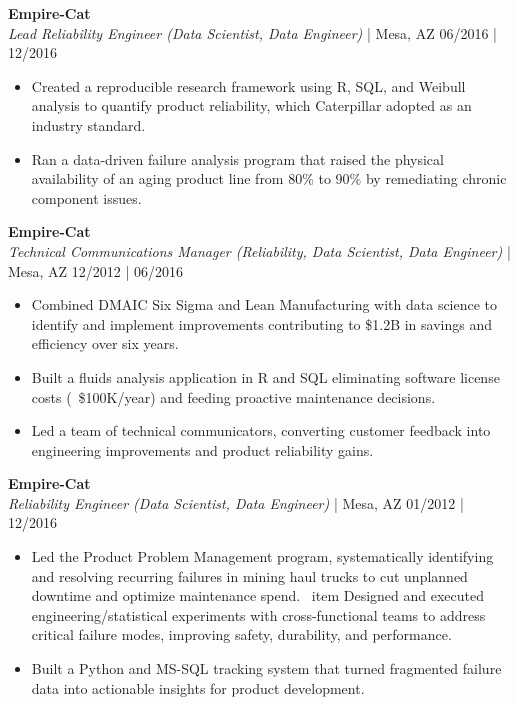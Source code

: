 \documentclass[10pt, letterpaper, sans]{article}
\begin{document}
\textbf{Empire-Cat} \\
\textit{Lead Reliability Engineer (Data Scientist, Data Engineer)} | Mesa, AZ \hfill 06/2016 | 12/2016

\begin{itemize}
    
    \item Created a reproducible research framework using R, SQL, and Weibull analysis to quantify product reliability, which Caterpillar adopted as an industry standard.
    
    \item Ran a data-driven failure analysis program that raised the physical availability of an aging product line from 80\% to 90\% by remediating chronic component issues.
  
\end{itemize}


\textbf{Empire-Cat} \\
\textit{Technical Communications Manager (Reliability, Data Scientist, Data Engineer)} | Mesa, AZ \hfill 12/2012 | 06/2016

\begin{itemize}
    
    \item Combined DMAIC Six Sigma and Lean Manufacturing with data science to identify and implement improvements contributing to \$1.2B in savings and efficiency over six years.
    
    \item Built a fluids analysis application in R and SQL eliminating software license costs (~\$100K/year) and feeding proactive maintenance decisions.
    
    \item Led a team of technical communicators, converting customer feedback into engineering improvements and product reliability gains.
  
\end{itemize}


\textbf{Empire-Cat} \\
\textit{Reliability Engineer (Data Scientist, Data Engineer)} | Mesa, AZ \hfill 01/2012 | 12/2016

\begin{itemize} 
    
    \item Led the Product Problem Management program, systematically identifying and resolving recurring failures in mining haul trucks to cut unplanned downtime and optimize maintenance spend.
    \
    item Designed and executed engineering/statistical experiments with cross-functional teams to address critical failure modes, improving safety, durability, and performance.
    
    \item Built a Python and MS-SQL tracking system that turned fragmented failure data into actionable insights for product development.
  
\end{itemize}
\end{document}
